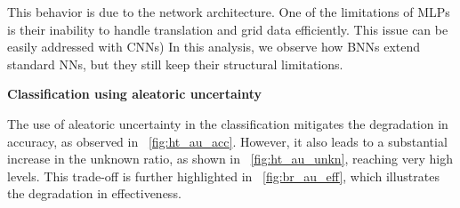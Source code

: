 This behavior is due to the network architecture. One of the limitations of MLPs is their inability to handle translation and grid data efficiently. This issue can be easily addressed with CNNs) In this analysis, we observe how BNNs extend standard NNs, but they still keep their structural limitations.

\vspace{0.3cm}
\textbf{Classification using aleatoric uncertainty}
\vspace{0.1cm}

The use of aleatoric uncertainty in the classification mitigates the degradation in accuracy, as observed in \Fig~\ref{fig:ht_au_acc}. However, it also leads to a substantial increase in the unknown ratio, as shown in \Fig~\ref{fig:ht_au_unkn}, reaching very high levels. This trade-off is further highlighted in \Fig~\ref{fig:br_au_eff}, which illustrates the degradation in effectiveness.

